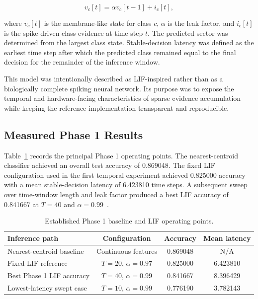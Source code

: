 \[
    v_c[t]=\alpha v_c[t-1]+i_c[t],
\]

where $v_c[t]$ is the membrane-like state for class $c$, $\alpha$ is the leak factor, and $i_c[t]$ is the spike-driven class evidence at time step $t$. The predicted sector was determined from the largest class state. Stable-decision latency was defined as the earliest time step after which the predicted class remained equal to the final decision for the remainder of the inference window.

This model was intentionally described as LIF-inspired rather than as a biologically complete spiking neural network. Its purpose was to expose the temporal and hardware-facing characteristics of sparse evidence accumulation while keeping the reference implementation transparent and reproducible.

\subsection{Measured Phase 1 Results}

Table~\ref{tab:phase1_measured_results} records the principal Phase 1 operating points. The nearest-centroid classifier achieved an overall test accuracy of 0.869048. The fixed LIF configuration used in the first temporal experiment achieved 0.825000 accuracy with a mean stable-decision latency of 6.423810 time steps. A subsequent sweep over time-window length and leak factor produced a best LIF accuracy of 0.841667 at $T=40$ and $\alpha=0.99$~\cite{molhem2026phase1}.

\begin{table}[H]
\centering
\caption{Established Phase 1 baseline and LIF operating points.}
\label{tab:phase1_measured_results}
\begin{tabular}{@{}lccc@{}}
\toprule
\textbf{Inference path} & \textbf{Configuration} & \textbf{Accuracy} & \textbf{Mean latency} \\
\midrule
Nearest-centroid baseline & Continuous features & 0.869048 & N/A \\
Fixed LIF reference & $T=20$, $\alpha=0.97$ & 0.825000 & 6.423810 \\
Best Phase 1 LIF accuracy & $T=40$, $\alpha=0.99$ & 0.841667 & 8.396429 \\
Lowest-latency swept case & $T=10$, $\alpha=0.99$ & 0.776190 & 3.782143 \\
\bottomrule
\end{tabular}
\end{table}

